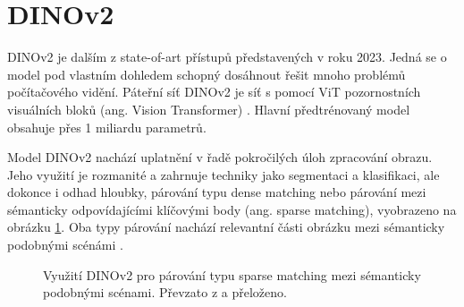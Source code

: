 \section{DINOv2}
\label{sec:Chapter27}

DINOv2 je dalším z state-of-art přístupů představených v \cite{dinov2} roku 2023. Jedná se o model pod vlastním dohledem schopný dosáhnout řešit mnoho problémů počítačového vidění. Páteřní síť DINOv2 je síť s pomocí ViT pozornostních visuálních bloků (ang. Vision Transformer) \cite{vit}. Hlavní předtrénovaný model obsahuje přes 1 miliardu parametrů.

Model DINOv2 nachází uplatnění v řadě pokročilých úloh zpracování obrazu. Jeho využití je rozmanité a zahrnuje techniky jako segmentaci a klasifikaci, ale dokonce i odhad hloubky, párování typu dense matching nebo párování mezi sémanticky odpovídajícími klíčovými body (ang. sparse matching), vyobrazeno na obrázku \ref{fig:dinov2_sparse_matching}. Oba typy párování nachází relevantní části obrázku mezi sémanticky podobnými scénámi \cite{dinov2.metademolab.com}.

\begin{figure}[H]
\centering

\newcommand{\subfiguresize}{.15\textwidth}
\newcommand{\imagewidth}{1.0in}
\newcommand{\hspacesize}{.43in}

\newcommand{\insertimage}[1]{%
  \begin{minipage}{\imagewidth}
    \centering
    \texttt{[image: \#1]}
  \end{minipage}
}

\hspace{\hspacesize}%

\caption[Využití DINOv2 pro párování typu sparse matching]
{Využití DINOv2 pro párování typu sparse matching mezi sémanticky podobnými scénami. Převzato z \cite{dinov2} a přeloženo.}
\label{fig:dinov2_sparse_matching}
\end{figure}

\endinput